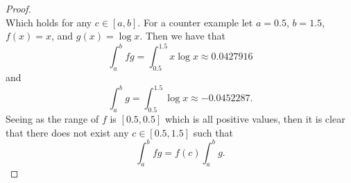 \documentclass[12pt]{article}
\begin{document}
\begin{enumerate}
\begin{proof}
\begin{equation*}
                \end{equation*}
                Which holds for any $c\in[a, b]$.
                For a counter example let $a=0.5$, $b=1.5$, $f(x)=x$, and
                $g(x)=\log x$. Then we have that
                \begin{equation*}
                    \int_{a}^bfg=\int_{0.5}^{1.5}x\log x\approx 0.0427916
                \end{equation*}
                and 
                \begin{equation*}
                    \int_{a}^b g=\int_{0.5}^{1.5}\log x\approx -0.0452287.
                \end{equation*}
                Seeing as the range of $f$ is $[0.5, 0.5]$ which is all
                positive values, then it is clear
                that there does not exist any $c\in[0.5, 1.5]$ such that 
                \begin{equation*}
                    \int_{a}^bfg=f(c)\int_{a}^b g.
                \end{equation*}
            \end{proof}
    \end{enumerate}
\end{document}
